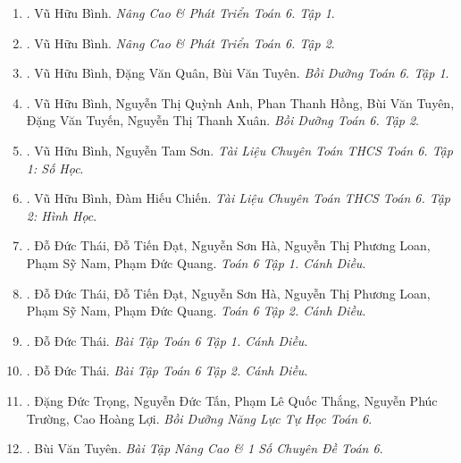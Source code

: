 \documentclass{article}
\begin{document}
\begin{enumerate}
	\item \cite{Binh_Toan_6_tap_1}. {\sc Vũ Hữu Bình}. {\it Nâng Cao \& Phát Triển Toán 6. Tập 1}.\hfill{\sf[done]}
	
	\item \cite{Binh_Toan_6_tap_2}. {\sc Vũ Hữu Bình}. {\it Nâng Cao \& Phát Triển Toán 6. Tập 2}.\hfill{\sf[done]}
	
	\item \cite{Binh_boi_duong_Toan_6_tap_1}. {\sc Vũ Hữu Bình, Đặng Văn Quân, Bùi Văn Tuyên}. {\it Bồi Dưỡng Toán 6. Tập 1}.\hfill{\sf[done]}
	
	\item \cite{Binh_boi_duong_Toan_6_tap_2}. {\sc Vũ Hữu Bình, Nguyễn Thị Quỳnh Anh, Phan Thanh Hồng, Bùi Văn Tuyên, Đặng Văn Tuyến, Nguyễn Thị Thanh Xuân}. {\it Bồi Dưỡng Toán 6. Tập 2}.\hfill{\sf[done]}
	
	\item \cite{TLCT_THCS_Toan_6_so_hoc}. {\sc Vũ Hữu Bình, Nguyễn Tam Sơn}. {\it Tài Liệu Chuyên Toán THCS Toán 6. Tập 1: Số Học}.\hfill{\sf[done]}
	
	\item \cite{TLCT_THCS_Toan_6_hinh_hoc}. {\sc Vũ Hữu Bình, Đàm Hiếu Chiến}. {\it Tài Liệu Chuyên Toán THCS Toán 6. Tập 2: Hình Học}.\hfill{\sf[done]}
	
	\item \cite{SGK_Toan_6_Canh_Dieu_tap_1}. {\sc Đỗ Đức Thái, Đỗ Tiến Đạt, Nguyễn Sơn Hà, Nguyễn Thị Phương Loan, Phạm Sỹ Nam, Phạm Đức Quang}. {\it Toán 6 Tập 1. Cánh Diều}.\hfill{\sf[done]}
	
	\item \cite{SGK_Toan_6_Canh_Dieu_tap_2}. {\sc Đỗ Đức Thái, Đỗ Tiến Đạt, Nguyễn Sơn Hà, Nguyễn Thị Phương Loan, Phạm Sỹ Nam, Phạm Đức Quang}. {\it Toán 6 Tập 2. Cánh Diều}.\hfill{\sf[done]}
	
	\item \cite{SBT_Toan_6_Canh_Dieu_tap_1}. {\sc Đỗ Đức Thái}. {\it Bài Tập Toán 6 Tập 1. Cánh Diều}.\hfill{\sf[done]}
	
	\item \cite{SBT_Toan_6_Canh_Dieu_tap_2}. {\sc Đỗ Đức Thái}. {\it Bài Tập Toán 6 Tập 2. Cánh Diều}.\hfill{\sf[done]}
	
	\item \cite{Trong_Toan_6}. {\sc Đặng Đức Trọng, Nguyễn Đức Tấn, Phạm Lê Quốc Thắng, Nguyễn Phúc Trường, Cao Hoàng Lợi}. {\it Bồi Dưỡng Năng Lực Tự Học Toán 6}.\hfill{\sf[reading]}
	
	\item \cite{Tuyen_Toan_6}. {\sc Bùi Văn Tuyên}. {\it Bài Tập Nâng Cao \& 1 Số Chuyên Đề Toán 6}.\hfill{\sf[done]}
\end{enumerate}
\end{document}
